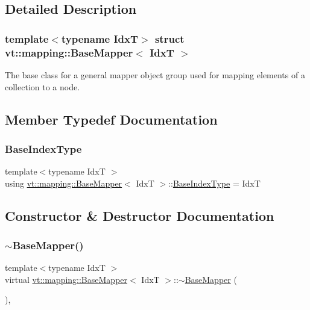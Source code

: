 \subsection{Detailed Description}
\subsubsection*{template$<$typename IdxT$>$\newline
struct vt\+::mapping\+::\+Base\+Mapper$<$ Idx\+T $>$}

The base class for a general mapper object group used for mapping elements of a collection to a node. 

\subsection{Member Typedef Documentation}
\mbox{\label{structvt_1_1mapping_1_1_base_mapper_a92c525b6dd69ead3a631626a75c4c0bc}} 
\subsubsection{\texorpdfstring{Base\+Index\+Type}{BaseIndexType}}
{\footnotesize\ttfamily template$<$typename IdxT $>$ \\
using \hyperlink{structvt_1_1mapping_1_1_base_mapper}{vt\+::mapping\+::\+Base\+Mapper}$<$ IdxT $>$\+::\hyperlink{structvt_1_1mapping_1_1_base_mapper_a92c525b6dd69ead3a631626a75c4c0bc}{Base\+Index\+Type} =  IdxT}



\subsection{Constructor \& Destructor Documentation}
\mbox{\label{structvt_1_1mapping_1_1_base_mapper_acafa2909b2b0fd8e3a907562c099f722}} 
\subsubsection{\texorpdfstring{$\sim$\+Base\+Mapper()}{~BaseMapper()}}
{\footnotesize\ttfamily template$<$typename IdxT $>$ \\
virtual \hyperlink{structvt_1_1mapping_1_1_base_mapper}{vt\+::mapping\+::\+Base\+Mapper}$<$ IdxT $>$\+::$\sim$\hyperlink{structvt_1_1mapping_1_1_base_mapper}{Base\+Mapper} (\begin{DoxyParamCaption}{ }\end{DoxyParamCaption})\hspace{0.3cm}{\ttfamily [virtual]}, {\ttfamily [default]}}



